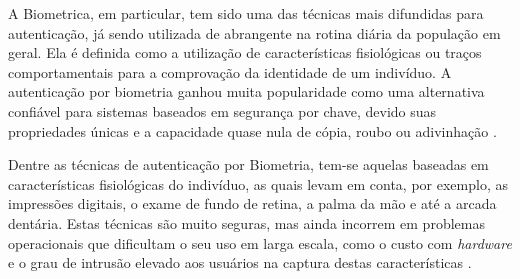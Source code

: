 

A Biometrica, em particular, tem sido uma das técnicas mais difundidas para autenticação, já sendo utilizada de abrangente na rotina diária da população em geral. Ela é definida como a utilização de características fisiológicas ou traços comportamentais para a comprovação da identidade de um indivíduo. A autenticação por biometria ganhou muita popularidade como uma alternativa confiável para sistemas baseados em segurança por chave, devido suas propriedades únicas e a capacidade quase nula de cópia, roubo ou adivinhação \cite{kholmatov}.

Dentre as técnicas de autenticação por Biometria, tem-se aquelas baseadas em características fisiológicas do indivíduo, as quais levam em conta, por exemplo, as impressões digitais, o exame de fundo de retina, a palma da mão e até a arcada dentária. Estas técnicas são muito seguras, mas ainda incorrem em problemas operacionais que dificultam o seu uso em larga escala, como o custo com \emph{hardware} e o grau de intrusão elevado aos usuários na captura destas características \cite{noheinen2002}. 


